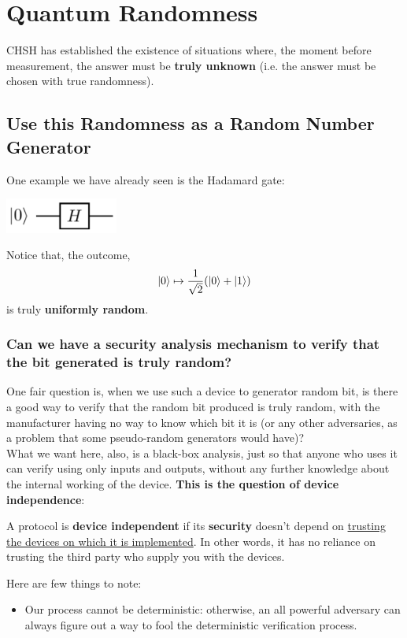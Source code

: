 \documentclass[12pt]{article}
\begin{document}
\section{Quantum Randomness}
CHSH has established the existence of situations where, the moment before measurement, the answer must be \textbf{truly unknown} (i.e. the answer must be chosen with true randomness).

\subsection{Use this Randomness as a Random Number Generator}
One example we have already seen is the Hadamard gate:
\begin{center}
    \includegraphics[width = 10em]{images/2.jpg}
\end{center}
Notice that, the outcome, $$
\Ket{0}\mapsto \frac{1}{\sqrt{2}}(\Ket{0} + \Ket{1})
$$ is truly \textbf{uniformly random}.

\subsubsection{Can we have a security analysis mechanism to verify that the bit generated is truly random?}
One fair question is, when we use such a device to generator random bit, is there a good way to verify that the random bit produced is truly random, with the manufacturer having no way to know which bit it is (or any other adversaries, as a problem that some pseudo-random generators would have)?\\

\noindent What we want here, also, is a black-box analysis, just so that anyone who uses it can verify using only inputs and outputs, without any further knowledge about the internal working of the device. \textbf{This is the question of device independence}:

\begin{definition}
A protocol is \textbf{device independent} if its \textbf{security} doesn’t depend on \underline{trusting the devices on which it is implemented}. In other words, it has no reliance on trusting the third party who supply you with the devices.
\end{definition}

\begin{idea}
Here are few things to note:
\begin{itemize}
    \item Our process cannot be deterministic: otherwise, an all powerful adversary can always figure out a way to fool the deterministic verification process.
\end{itemize}
\end{idea}
\end{document}
